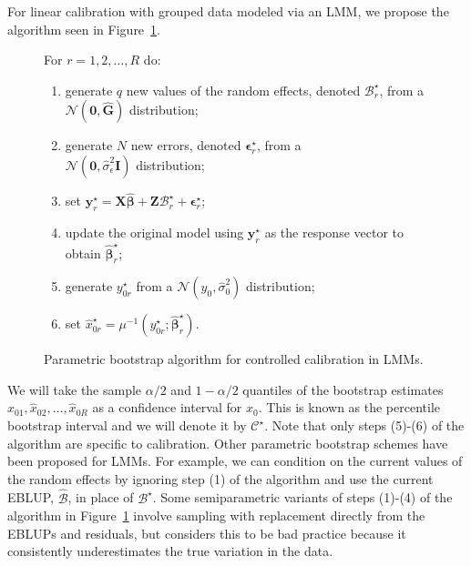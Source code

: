 \documentclass[useAMS,usenatbib,usegraphicx,referee]{biom}\usepackage[]{graphicx}\usepackage[]{color}
\newcommand{\boot}{\star}
\newcommand{\X}{\ensuremath{\bm{X}}}
\newcommand{\Z}{\ensuremath{\bm{Z}}}
\begin{document}
For linear calibration with grouped data modeled via an LMM, we propose the algorithm seen in Figure~\ref{alg:pb}.
\begin{figure}
\begin{framed}
For $r = 1, 2, \dotsc, R$ do:
\begin{enumerate}
  \item generate $q$ new values of the random effects, denoted $\bm{\mathscr{B}}_r^\boot$, from a $\mathcal{N}\left(\bm{0}, \widehat{\bm{G}}\right)$ distribution; 
  \item generate $N$ new errors, denoted $\bm{\epsilon}_r^\boot$, from a \\ $\mathcal{N}\left(\bm{0}, \widehat{\sigma}_\epsilon^2\bm{I}\right)$ distribution;
  \item set $\bm{y}_r^\boot = \X\widehat{\bm{\beta}} + \Z\bm{\mathscr{B}}_r^\boot + \bm{\epsilon}_r^\boot$;
  \item update the original model using $\bm{y}_r^\boot$ as the response vector to obtain $\widehat{\bm{\beta}}_r^\boot$;
  \item generate $y_{0r}^\boot$ from a $\mathcal{N}\left(y_0, \widehat{\sigma}_0^2\right)$ distribution;
  \item set $\widehat{x}_{0r}^\boot = \mu^{-1}\left(y_{0r}^\boot; \widehat{\bm{\beta}}_r^\boot\right)$.
\end{enumerate}
\end{framed}
\caption{Parametric bootstrap algorithm for controlled calibration in LMMs.}
\label{alg:pb}
\end{figure}
We will take the sample $\alpha/2$ and $1-\alpha/2$ quantiles of the bootstrap estimates $\widehat{x}_{01}, \widehat{x}_{02}, \dotsc, \widehat{x}_{0R}$ as a confidence interval for $x_0$. This is known as the percentile bootstrap interval and we will denote it by $\mathcal{C}^\boot$. Note that only steps (5)-(6) of the algorithm are specific to calibration. Other parametric bootstrap schemes have been proposed for LMMs. For example, we can condition on the current values of the random effects by ignoring step (1) of the algorithm and use the current EBLUP, $\widehat{\bm{\mathscr{B}}}$, in place of $\bm{\mathscr{B}}^\boot$. Some semiparametric variants of steps (1)-(4) of the algorithm in Figure~\ref{alg:pb} involve sampling with replacement directly from the EBLUPs and residuals, but \citet{morris_blups_2002} considers this to be bad practice because it consistently underestimates the true variation in the data.
\end{document}
